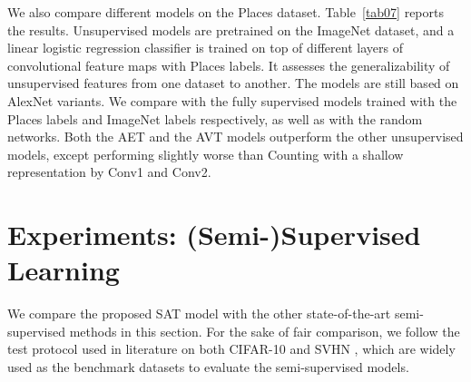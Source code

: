 \documentclass[10pt,journal,compsoc,twoside]{IEEEtran}
\begin{document}
We also compare different models on the Places dataset. Table~\ref{tab07} reports the results. Unsupervised models are pretrained on the ImageNet dataset, and a linear logistic regression classifier is trained on top of different layers of convolutional feature maps with Places labels. It assesses the generalizability of unsupervised features from one dataset to another. The models are still based on AlexNet variants. We compare with the fully supervised models trained with the Places labels and ImageNet labels respectively, as well as with the random networks. Both the AET and the AVT models outperform the other unsupervised models, except performing slightly worse than Counting \cite{zhang2017split} with a shallow representation by Conv1 and Conv2.

\section{Experiments: (Semi-)Supervised Learning}\label{sec:supexp}

We compare the proposed SAT model with the other state-of-the-art semi-supervised methods in this section. For the sake of fair comparison, we follow the test protocol used in literature \cite{tarvainen2017mean,laine2016temporal} on both CIFAR-10 \cite{krizhevsky2009learning} and SVHN \cite{netzer2011reading}, which are widely used as the benchmark datasets to evaluate the semi-supervised models.

%
\end{document}
